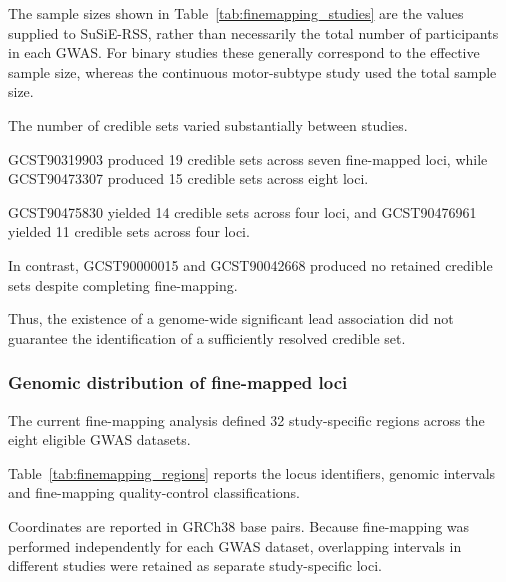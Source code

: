 \documentclass[11pt,a4paper]{article}
\begin{document}
The sample sizes shown in Table~\ref{tab:finemapping_studies}
are the values supplied to SuSiE-RSS, rather than
necessarily the total number of participants in each GWAS.
For binary studies these generally correspond to the
effective sample size, whereas the continuous
motor-subtype study used the total sample size.

The number of credible sets varied substantially
between studies.

GCST90319903 produced 19 credible sets across seven
fine-mapped loci, while GCST90473307 produced
15 credible sets across eight loci.

GCST90475830 yielded 14 credible sets across four loci,
and GCST90476961 yielded 11 credible sets across four loci.

In contrast, GCST90000015 and GCST90042668 produced
no retained credible sets despite completing fine-mapping.

Thus, the existence of a genome-wide significant lead
association did not guarantee the identification of
a sufficiently resolved credible set.


\subsubsection{Genomic distribution of fine-mapped loci}

The current fine-mapping analysis defined 32
study-specific regions across the eight eligible GWAS
datasets.

Table~\ref{tab:finemapping_regions} reports the locus
identifiers, genomic intervals and fine-mapping
quality-control classifications.

Coordinates are reported in GRCh38 base pairs.
Because fine-mapping was performed independently for
each GWAS dataset, overlapping intervals in different
studies were retained as separate study-specific loci.


\begingroup
\scriptsize
\setlength{\tabcolsep}{5pt}
\renewcommand{\arraystretch}{1.12}
\end{document}
